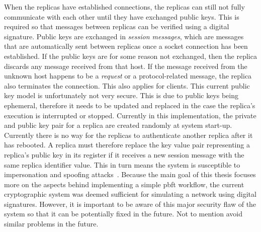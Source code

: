 When the replicas have established connections, the replicas can still not fully communicate with each other until they have exchanged public keys. This is required so that messages between replicas can be verified using a digital signature. Public keys are exchanged in \emph{session messages}, which are messages that are automatically sent between replicas once a socket connection has been established. If the public keys are for some reason not exchanged, then the replica discards any message received from that host. If the message received from the unknown host happens to be a \emph{request} or a protocol-related message, the replica also terminates the connection. This also applies for clients. This current public key model is unfortunately not very secure. This is due to public keys being ephemeral, therefore it needs to be updated and replaced in the case the replica’s execution is interrupted or stopped. Currently in this implementation, the private and public key pair for a replica are created randomly at system start-up. Currently there is no way for the replicas to authenticate another replica after it has rebooted. A replica must therefore replace the key value pair representing a replica's public key in its register if it receives a new session message with the same replica identifier value. This in turn means the system is susceptible to impersonation and spoofing attacks~\cite{WEB:spoofingAttack}. Because the main goal of this thesis focuses more on the aspects behind implementing a simple \ac{pbft} workflow, the current cryptographic system was deemed sufficient for simulating a network using digital signatures. However, it is important to be aware of this major security flaw of the system so that it can be potentially fixed in the future. Not to mention avoid similar problems in the future.


